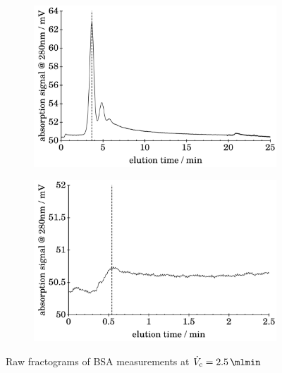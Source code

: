 \begin{figure}[H]
\begin{center}
  \\\vspace*{.5em}
  \begin{subfigure}{\subFigSize}
    \includegraphics[width=\linewidth]{./images/data/rawPlots/img_BSA_VC_2_5_r3_te.pdf}
    \label{subfig:raw_BSA2_5_r3_te}
  \end{subfigure}
  \begin{subfigure}{\subFigSize}
    \includegraphics[width=\linewidth]{./images/data/rawPlots/img_BSA_VC_2_5_r3_t0.pdf}
  \end{subfigure}
  \end{center}
  \vspace*{-3ex}    
  \caption[Raw fractograms of BSA measurements at $\Vc = \SI{2.5}{\mlmin}$]{Raw fractograms of BSA measurements at $\Vc 
  = \SI{2.5}{\mlmin}$}
  \label{fig:raw_BSA_2_5_UV} 
\end{figure}
